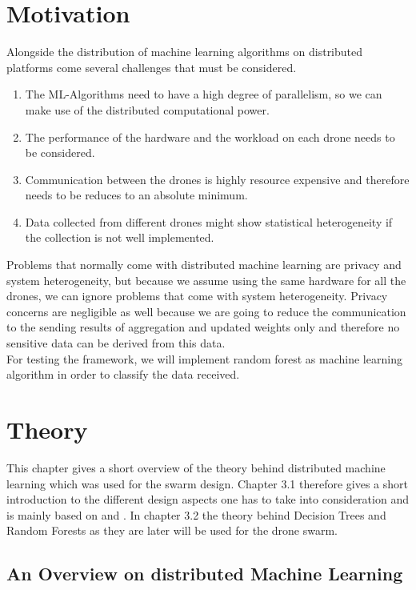 \section{Motivation} \label{sec:Mot}
Alongside the distribution of machine learning algorithms on distributed platforms come several challenges that must be considered.
\begin{enumerate}
    \item The ML-Algorithms need to have a high degree of parallelism, so we can make use of the distributed computational power.
    \item The performance of the hardware and the workload on each drone needs to be considered.
    \item Communication between the drones is highly resource expensive and therefore needs to be reduces to an absolute minimum.
    \item Data collected from different drones might show statistical heterogeneity if the collection is not well implemented.
\end{enumerate}
Problems that normally come with distributed machine learning are privacy and system heterogeneity, but because we assume using the same hardware for all the drones, we can ignore problems that come with system heterogeneity. Privacy concerns are negligible as well because we are going to reduce the communication to the sending results of aggregation and updated weights only and therefore no sensitive data can be derived from this data. \\
For testing the framework, we will implement random forest as machine learning algorithm in order to classify the data received. 



\section{Theory}
This chapter gives a short overview of the theory behind distributed machine learning which was used for the swarm design. Chapter 3.1 therefore gives a short introduction to the different design aspects one has to take into consideration and is mainly based on \cite{DBLP} and \cite{article}. In chapter 3.2 the theory behind Decision Trees and Random Forests as they are later will be used for the drone swarm.  

\subsection{An Overview on distributed Machine Learning}


